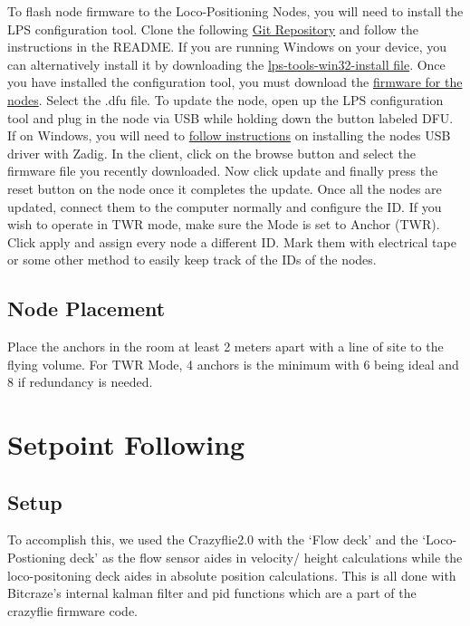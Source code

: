 \documentclass[]{article}
\begin{document}
\noindent To flash node firmware to the Loco-Positioning Nodes, you will need to install the LPS configuration tool. Clone the following \href{https://github.com/bitcraze/lps-tools}{Git Repository} and follow the instructions in the README. If you are running Windows on your device, you can alternatively install it by downloading the \href{https://github.com/bitcraze/lps-tools/releases}{lps-tools-win32-install file}. Once you have installed the configuration tool, you must download the \href{https://github.com/bitcraze/lps-node-firmware/releases}{firmware for the nodes}. Select the .dfu file. To update the node, open up the LPS configuration tool and plug in the node via USB while holding down the button labeled DFU. If on Windows, you will need to \href{https://wiki.bitcraze.io/misc:usbwindows}{follow instructions} on installing the nodes USB driver with Zadig. In the client, click on the browse button and select the firmware file you recently downloaded. Now click update and finally press the reset button on the node once it completes the update. Once all the nodes are updated, connect them to the computer normally and configure the ID. If you wish to operate in TWR mode, make sure the Mode is set to Anchor (TWR). Click apply and assign every node a different ID. Mark them with electrical tape or some other method to easily keep track of the IDs of the nodes.

\subsection{Node Placement}

\noindent Place the anchors in the room at least 2 meters apart with a line of site to the flying volume. For TWR Mode, 4 anchors is the minimum with 6 being ideal and 8 if redundancy is needed.

\section{Setpoint Following}

\subsection{Setup}

\noindent To accomplish this, we used the Crazyflie2.0 with the `Flow deck' %
 and the `Loco-Postioning deck' %
 as the flow sensor aides in velocity/ height calculations while the loco-positoning deck aides in absolute position calculations. This is all done with Bitcraze's internal kalman filter and pid functions which are a part of the crazyflie firmware code.
 
\end{document}
